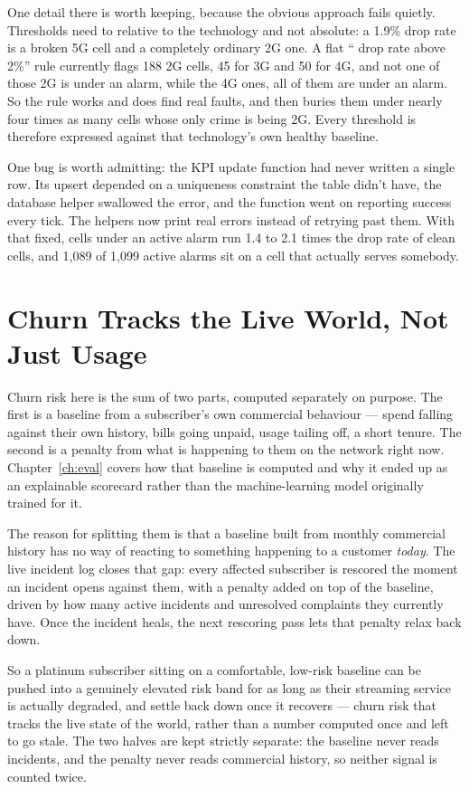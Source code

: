 One detail there is worth keeping, because the obvious approach fails
quietly. Thresholds need to relative to the technology and not absolute: a 
1.9\% drop rate is a broken 5G cell and a completely ordinary 2G one. A flat ``
drop rate above 2\%'' rule currently flags 188 2G cells, 45 for 3G and 50 for 
4G, and not one of those 2G is under an alarm, while the 4G ones, all of them are 
under an alarm. So the rule works and does find real faults, and then buries them
under nearly four times as many cells whose only crime is being 2G.
Every threshold is therefore expressed against that technology's own
healthy baseline.

One bug is worth admitting: the KPI update function had never written a single
row. Its upsert depended on a uniqueness constraint the table didn't have, the
database helper swallowed the error, and the function went on reporting success
every tick. The helpers now print real errors instead of retrying past them.
With that fixed, cells under an active alarm run 1.4 to 2.1 times the drop rate
of clean cells, and 1{,}089 of 1{,}099 active alarms sit on a cell that actually
serves somebody.


\section{Churn Tracks the Live World, Not Just Usage}

Churn risk here is the sum of two parts, computed separately on purpose. The
first is a baseline from a subscriber's own commercial behaviour --- spend
falling against their own history, bills going unpaid, usage tailing off, a short
tenure. The second is a penalty from what is happening to them on the network
right now. Chapter~\ref{ch:eval} covers how that baseline is computed and why it
ended up as an explainable scorecard rather than the machine-learning model
originally trained for it.

The reason for splitting them is that a baseline built from monthly commercial
history has no way of reacting to something happening to a customer
\emph{today}. The live incident log closes that gap: every affected subscriber
is rescored the moment an incident opens against them, with a penalty added on
top of the baseline, driven by how many active incidents and unresolved
complaints they currently have. Once the incident heals, the next rescoring pass
lets that penalty relax back down.

So a platinum subscriber sitting on a comfortable, low-risk baseline can be
pushed into a genuinely elevated risk band for as long as their streaming
service is actually degraded, and settle back down once it recovers --- churn
risk that tracks the live state of the world, rather than a number computed once
and left to go stale. The two halves are kept strictly separate: the baseline
never reads incidents, and the penalty never reads commercial history, so
neither signal is counted twice.

